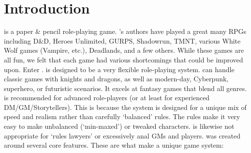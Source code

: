 \documentclass[twoside]{book}
\begin{document}
\section{Introduction}
    \APATHY{}  is a paper \& pencil role-playing game.
            \APATHY{}'s authors have played a great many RPGs
            including D\&D, Heroes Unlimited, GURPS, Shadowrun, TMNT,
            various White Wolf games (Vampire, etc.), Deadlands, and a
            few others. While these games are all fun, we felt that each
            game had various shortcomings that could be improved upon.
            Enter \APATHY{}. \APATHY{}  is designed to be a very
            flexible role-playing system. \APATHY{}  can handle classic
            games with knights and dragons, as well as modern-day,
            Cyberpunk, superhero, or futuristic scenarios. It excels at
            fantasy games that blend all genres.
          \APATHY{}  is recommended for advanced role-players (or
            at least for experienced DM/GM/Storytellers). This is because
            the \APATHY{}  system is designed for a unique mix of speed
            and realism rather than carefully `balanced'
            rules. The \APATHY{}  rules make it very easy to make
            unbalanced (`min-maxed') or tweaked characters.
            \APATHY{}  is likewise not appropriate for `rules
            lawyers' or excessively anal GMs and players.
          \APATHY{}  was created around several core features.
            These are what make \APATHY{}  a unique game system:
          
\end{document}
